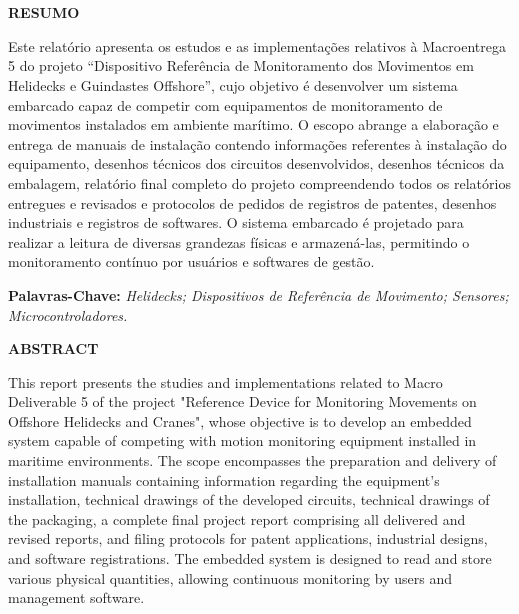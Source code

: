\documentclass[a4paper, 12pt]{article}
\makeatletter
\renewcommand\tableofcontents{%
    \centering
    \section*{\contentsname
        \@mkboth{%
           \MakeUppercase\contentsname}{\MakeUppercase\contentsname}}%
    \@starttoc{toc}%
    }
\makeatother
\begin{document}

\pagestyle{modeloTexto}


\newpage
\tableofcontents
\newpage
\listoffigures
\newpage
\raggedright
\justifying
\normalsize


\newpage
\begin{center}
    \Large \textbf{RESUMO}
\end{center}

\noindent
Este relatório apresenta os estudos e as implementações relativos à Macroentrega 5 do projeto “Dispositivo Referência de Monitoramento dos Movimentos em Helidecks e Guindastes Offshore”, cujo objetivo é desenvolver um sistema embarcado capaz de competir com equipamentos de monitoramento de movimentos instalados em ambiente marítimo. O escopo abrange a elaboração e entrega de manuais de instalação contendo informações referentes à instalação do equipamento, desenhos técnicos dos circuitos desenvolvidos, desenhos técnicos da embalagem, relatório final completo do projeto compreendendo todos os relatórios entregues e revisados e protocolos de pedidos de registros de patentes, desenhos industriais e registros de softwares. O sistema embarcado é projetado para realizar a leitura de diversas grandezas físicas e armazená-las, permitindo o monitoramento contínuo por usuários e softwares de gestão.

\vspace{.15cm}
\noindent
\textbf{Palavras-Chave:} \textit{Helidecks; Dispositivos de Referência de Movimento; Sensores; Microcontroladores.}

\vspace{1cm}

\begin{center}
    \Large \textbf{ABSTRACT}
\end{center}

\noindent
This report presents the studies and implementations related to Macro Deliverable 5 of the project "Reference Device for Monitoring Movements on Offshore Helidecks and Cranes", whose objective is to develop an embedded system capable of competing with motion monitoring equipment installed in maritime environments. The scope encompasses the preparation and delivery of installation manuals containing information regarding the equipment's installation, technical drawings of the developed circuits, technical drawings of the packaging, a complete final project report comprising all delivered and revised reports, and filing protocols for patent applications, industrial designs, and software registrations. The embedded system is designed to read and store various physical quantities, allowing continuous monitoring by users and management software.
\end{document}
